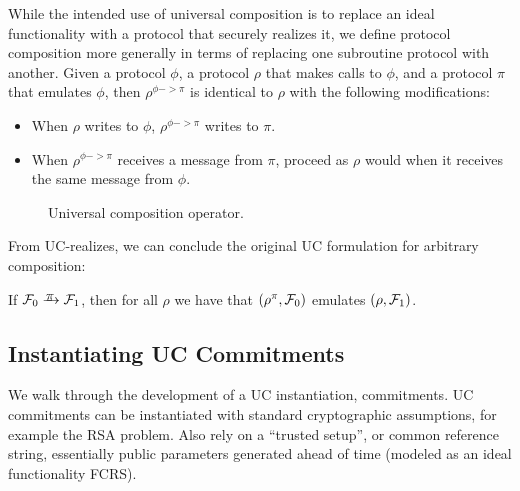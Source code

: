 While the intended use of universal composition is to replace an ideal
functionality with a protocol that securely realizes it, we define protocol
composition  more generally in terms of replacing one subroutine protocol with
another. Given a protocol $\phi$, a protocol $\rho$ that makes calls to $\phi$,
and a
protocol $\pi$ that emulates $\phi$, then $\rho^{\phi -> \pi}$ is identical to $\rho$ with the
following modifications:
\begin{itemize}[leftmargin=*]
  \item When $\rho$ writes to $\phi$, $\rho^{\phi -> \pi}$ writes to $\pi$.
  \item When $\rho^{\phi -> \pi}$ receives a message from $\pi$, proceed as $\rho$ would when
    it receives the same message from $\phi$.
\end{itemize}

\begin{figure}

\caption{Universal composition operator.}
\label{fig:composition-operator}
\end{figure}

From UC-realizes, we can conclude the original UC formulation for arbitrary
composition:
\begin{theorem}
  If $\mc{F}_0 \yrightarrow{$\pi$} \mc{F}_1$, then for all $\rho$ we
  have that $(\rho^{\pi}, \mathcal{{F}}_0)$ emulates $(\rho, \mathcal{{F}}_1)$.
\end{theorem}

\subsection{Instantiating UC Commitments}
\label{subsec:example}
We walk through the development of a UC instantiation, commitments.
UC commitments can be instantiated with standard cryptographic assumptions, for example the RSA problem.
Also rely on a ``trusted setup'', or common reference string, essentially public parameters generated ahead of time (modeled as an ideal functionality FCRS).

